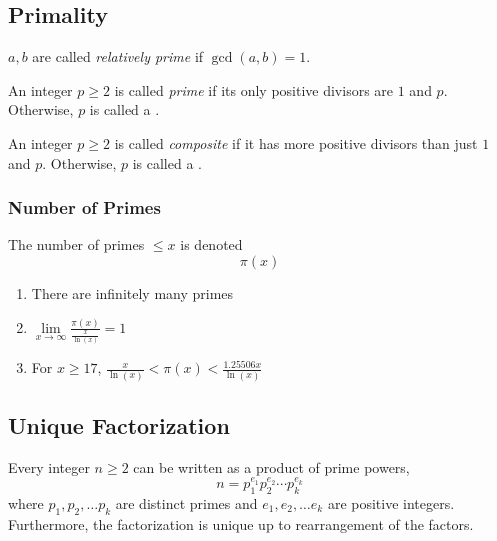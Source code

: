 \subsection{Primality}\label{subsec:Primality}
\begin{definition}\label{def:Relatively_Prime}
  $a, b$ are called \emph{relatively prime} if $\gcd(a, b) = 1$.
\end{definition}

\begin{definition}[Prime]\label{def:Prime}
  An integer $p \geq 2$ is called \emph{prime} if its only positive divisors are $1$ and $p$.
  Otherwise, $p$ is called a \emph{}.
\end{definition}

\begin{definition}[Composite]\label{def:Composite}
  An integer $p \geq 2$ is called \emph{composite} if it has more positive divisors than just $1$ and $p$.
  Otherwise, $p$ is called a \emph{}.
\end{definition}

\subsubsection{Number of Primes}\label{subsubsec:Number_of_Primes}
The number of primes $\leq x$ is denoted
\begin{equation}\label{eq:Number_of_Primes}
  \pi(x)
\end{equation}
\begin{enumerate}[noitemsep]
\item There are infinitely many primes
\item $\lim\limits_{x \rightarrow \infty} \frac{\pi(x)}{\frac{x}{\ln(x)}} = 1$
\item For $x \geq 17$, $\frac{x}{\ln(x)} < \pi(x) < \frac{1.25506x}{\ln(x)}$
\end{enumerate}

\subsection{Unique Factorization}\label{subsec:Unique_Factorization}
\begin{theorem}\label{thm:Unique_Factorization_Theorem}
  Every integer $n \geq 2$ can be written as a product of prime powers,
  \begin{equation*}
    n = p_{1}^{e_{1}} p_{2}^{e_{2}} \cdots p_{k}^{e_{k}}
  \end{equation*}
  where $p_{1}, p_{2}, \ldots p_{k}$ are distinct primes and $e_{1}, e_{2}, \ldots e_{k}$ are positive integers.
  Furthermore, the factorization is unique up to rearrangement of the factors.
\end{theorem}

